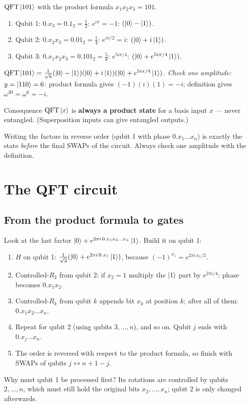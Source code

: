 \documentclass[11pt,a4paper,openany]{book}
\newcounter{wex}[chapter]
\newenvironment{steps}{\begin{enumerate}[label=\textbf{Step \arabic*.}, leftmargin=4.2em, itemsep=2pt]}{\end{enumerate}}
\newcommand{\QFT}{\mathrm{QFT}}
\begin{document}
\begin{wexample}{$\QFT\ket{101}$ with the product formula}
$x_1x_2x_3 = 101$.
\begin{steps}
\item Qubit 1: $0.x_3 = 0.1_2 = \frac12$: $e^{i\pi} = -1$: $(\ket0 - \ket1)$.
\item Qubit 2: $0.x_2x_3 = 0.01_2 = \frac14$: $e^{i\pi/2} = i$: $(\ket0 + i\ket1)$.
\item Qubit 3: $0.x_1x_2x_3 = 0.101_2 = \frac58$: $e^{5i\pi/4}$: $(\ket0 + e^{5i\pi/4}\ket1)$.
\end{steps}
$\QFT\ket{101} = \frac{1}{\sqrt8}(\ket0 - \ket1)(\ket0 + i\ket1)(\ket0 + e^{5i\pi/4}\ket1)$.
\emph{Check one amplitude:} $y = \ket{110} = 6$: product formula gives $(-1)(i)(1) = -i$; definition gives $\omega^{30} = \omega^{6} = -i$. \checkmark
\end{wexample}

\begin{keyres}{Consequence}
$\QFT\ket x$ is \textbf{always a product state} for a basis input $x$ --- never entangled. (Superposition inputs can give
entangled outputs.)
\end{keyres}

\begin{trap}
Writing the factors in reverse order (qubit 1 with phase $0.x_1\dots x_n$) is exactly the state \emph{before} the final
SWAPs of the circuit. Always check one amplitude with the definition.
\end{trap}

\section{The QFT circuit}
\subsection{From the product formula to gates}
Look at the last factor $\ket0 + e^{2\pi i\,0.x_1x_2\dots x_n}\ket1$. Build it on qubit 1:
\begin{steps}
\item $H$ on qubit 1: $\frac{1}{\sqrt2}(\ket0 + e^{2\pi i\,0.x_1}\ket1)$, because $(-1)^{x_1} = e^{2\pi i\,x_1/2}$.
\item Controlled-$R_2$ from qubit 2: if $x_2 = 1$ multiply the $\ket1$ part by $e^{2\pi i/4}$: phase becomes $0.x_1x_2$.
\item Controlled-$R_k$ from qubit $k$ appends bit $x_k$ at position $k$; after all of them: $0.x_1x_2\dots x_n$.
\item Repeat for qubit 2 (using qubits $3, \dots, n$), and so on. Qubit $j$ ends with $0.x_j\dots x_n$.
\item The order is reversed with respect to the product formula, so finish with SWAPs of qubits $j \leftrightarrow n+1-j$.
\end{steps}
Why must qubit 1 be processed first? Its rotations are controlled by qubits $2, \dots, n$, which must still hold the
original bits $x_2, \dots, x_n$; qubit 2 is only changed afterwards.
\end{document}
